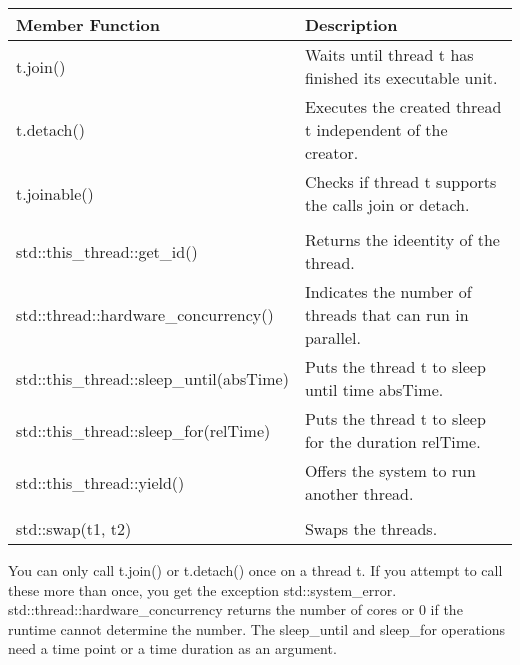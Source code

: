 \begin{longtable}[c]{|l|l|}
\hline
\textbf{Member Function}                                                   & \textbf{Description}                                      \\ \hline
\endfirsthead
%
\endhead
%
t.join()                                                                   & Waits until thread t has finished its executable unit.    \\ \hline
t.detach()                                                                 & Executes the created thread t independent of the creator. \\ \hline
t.joinable()                                                               & Checks if thread t supports the calls join or detach.     \\ \hline
\begin{tabular}[c]{@{}l@{}}t.get\_id() and\\ std::this\_thread::get\_id()\end{tabular} & Returns the ideentity of the thread. \\ \hline
std::thread::hardware\_concurrency()                                       & Indicates the number of threads that can run in parallel. \\ \hline
std::this\_thread::sleep\_until(absTime)                                   & Puts the thread t to sleep until time absTime.            \\ \hline
std::this\_thread::sleep\_for(relTime)                                     & Puts the thread t to sleep for the duration relTime.      \\ \hline
std::this\_thread::yield()                                                 & Offers the system to run another thread.                  \\ \hline
\begin{tabular}[c]{@{}l@{}}t.swap(t2) and\\ std::swap(t1, t2)\end{tabular} & Swaps the threads.                                        \\ \hline
\end{longtable}

You can only call t.join() or t.detach() once on a thread t. If you attempt to call these more than once, you get the exception std::system\_error. std::thread::hardware\_concurrency returns the number of cores or 0 if the runtime cannot determine the number. The sleep\_until and sleep\_for operations need a time point or a time duration as an argument.

